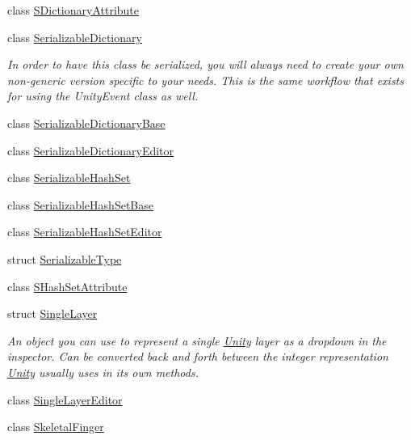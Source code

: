 \begin{DoxyCompactItemize}
\item 
class \mbox{\hyperlink{class_leap_1_1_unity_1_1_s_dictionary_attribute}{S\+Dictionary\+Attribute}}
\item 
class \mbox{\hyperlink{class_leap_1_1_unity_1_1_serializable_dictionary}{Serializable\+Dictionary}}
\begin{DoxyCompactList}\small\item\em In order to have this class be serialized, you will always need to create your own non-\/generic version specific to your needs. This is the same workflow that exists for using the Unity\+Event class as well. \end{DoxyCompactList}\item 
class \mbox{\hyperlink{class_leap_1_1_unity_1_1_serializable_dictionary_base}{Serializable\+Dictionary\+Base}}
\item 
class \mbox{\hyperlink{class_leap_1_1_unity_1_1_serializable_dictionary_editor}{Serializable\+Dictionary\+Editor}}
\item 
class \mbox{\hyperlink{class_leap_1_1_unity_1_1_serializable_hash_set}{Serializable\+Hash\+Set}}
\item 
class \mbox{\hyperlink{class_leap_1_1_unity_1_1_serializable_hash_set_base}{Serializable\+Hash\+Set\+Base}}
\item 
class \mbox{\hyperlink{class_leap_1_1_unity_1_1_serializable_hash_set_editor}{Serializable\+Hash\+Set\+Editor}}
\item 
struct \mbox{\hyperlink{struct_leap_1_1_unity_1_1_serializable_type}{Serializable\+Type}}
\item 
class \mbox{\hyperlink{class_leap_1_1_unity_1_1_s_hash_set_attribute}{S\+Hash\+Set\+Attribute}}
\item 
struct \mbox{\hyperlink{struct_leap_1_1_unity_1_1_single_layer}{Single\+Layer}}
\begin{DoxyCompactList}\small\item\em An object you can use to represent a single \mbox{\hyperlink{namespace_leap_1_1_unity}{Unity}} layer as a dropdown in the inspector. Can be converted back and forth between the integer representation \mbox{\hyperlink{namespace_leap_1_1_unity}{Unity}} usually uses in its own methods. \end{DoxyCompactList}\item 
class \mbox{\hyperlink{class_leap_1_1_unity_1_1_single_layer_editor}{Single\+Layer\+Editor}}
\item 
class \mbox{\hyperlink{class_leap_1_1_unity_1_1_skeletal_finger}{Skeletal\+Finger}}

\end{DoxyCompactItemize}
